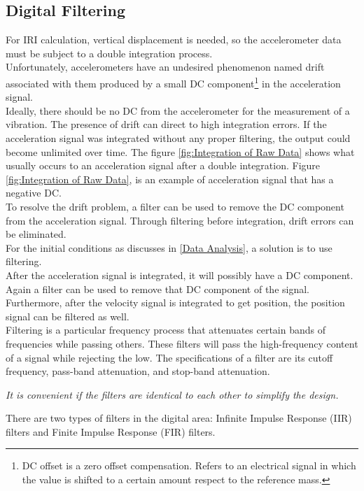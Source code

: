 \documentclass{standalone}
\begin{document}
\subsection{Digital Filtering} \label{Digital Filtering}
For IRI calculation, vertical displacement is needed, so the accelerometer data must be subject to a double integration process.\\
Unfortunately, accelerometers have an undesired phenomenon named drift associated with them produced by a small DC component\footnote{DC offset is a zero offset compensation. Refers to an electrical signal in which the value is shifted to a certain amount respect to the reference mass.} in the acceleration signal.\\
Ideally, there should be no DC from the accelerometer for the measurement of a vibration. The presence of drift can direct to high integration errors. If the acceleration signal was integrated without any proper filtering, the output could become unlimited over time. The figure \ref{fig:Integration of Raw Data} shows what usually occurs to an acceleration signal after a double integration. Figure \ref{fig:Integration of Raw Data}, is an example of acceleration signal that has a negative DC.\\To resolve the drift problem, a filter can be used to remove the DC component from the acceleration signal. Through filtering before integration, drift errors can be eliminated.\\
For the initial conditions as discusses in \ref{Data Analysis}, a solution is to use filtering.\\  
After the acceleration signal is integrated, it will possibly have a DC component. Again a filter can be used to remove that DC component of the signal. Furthermore, after the velocity signal is integrated to get position, the position signal can be filtered as well.	\\
Filtering is a particular frequency process that attenuates certain bands of frequencies while passing others. These filters will pass the high-frequency content of a signal while rejecting the low. The specifications of a filter are its cutoff frequency, pass-band attenuation, and stop-band attenuation. 
\begin{center}\textit{It is convenient if the filters are identical to each other to simplify the design.}\end{center}


There are two types of filters in the digital area: Infinite Impulse Response (IIR) filters and Finite Impulse Response (FIR) filters. 
\end{document}
